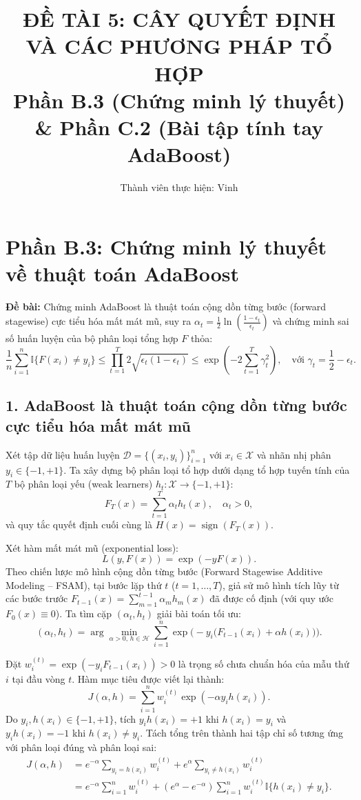 \documentclass[11pt, a4paper]{article}
\title{\textbf{\color{primary}ĐỀ TÀI 5: CÂY QUYẾT ĐỊNH VÀ CÁC PHƯƠNG PHÁP TỔ HỢP}\\
\large Phần B.3 (Chứng minh lý thuyết) \& Phần C.2 (Bài tập tính tay AdaBoost)}
\author{Thành viên thực hiện: Vinh}
\date{}
\begin{document}
\maketitle

\section*{Phần B.3: Chứng minh lý thuyết về thuật toán AdaBoost}

\textbf{Đề bài:} Chứng minh AdaBoost là thuật toán cộng dồn từng bước (forward stagewise) cực tiểu hóa mất mát mũ, suy ra $\alpha_t = \frac{1}{2}\ln\left(\frac{1-\epsilon_t}{\epsilon_t}\right)$ và chứng minh sai số huấn luyện của bộ phân loại tổng hợp $F$ thỏa:
\[
\frac{1}{n}\sum_{i=1}^{n} \mathbb{I}\{F(x_i) \ne y_i\} \le \prod_{t=1}^{T} 2\sqrt{\epsilon_t(1-\epsilon_t)} \le \exp\left(-2\sum_{t=1}^{T}\gamma_t^2\right), \quad \text{với } \gamma_t = \frac{1}{2} - \epsilon_t.
\]

\subsection*{1. AdaBoost là thuật toán cộng dồn từng bước cực tiểu hóa mất mát mũ}

Xét tập dữ liệu huấn luyện $\mathcal{D} = \{(x_i, y_i)\}_{i=1}^n$ với $x_i \in \mathcal{X}$ và nhãn nhị phân $y_i \in \{-1, +1\}$. Ta xây dựng bộ phân loại tổ hợp dưới dạng tổ hợp tuyến tính của $T$ bộ phân loại yếu (weak learners) $h_t: \mathcal{X} \to \{-1, +1\}$:
\[
F_T(x) = \sum_{t=1}^{T} \alpha_t h_t(x), \quad \alpha_t > 0,
\]
và quy tắc quyết định cuối cùng là $H(x) = \operatorname{sign}(F_T(x))$.

Xét hàm mất mát mũ (exponential loss):
\[
L(y, F(x)) = \exp(-y F(x)).
\]
Theo chiến lược mô hình cộng dồn từng bước (Forward Stagewise Additive Modeling -- FSAM), tại bước lặp thứ $t$ ($t = 1, \dots, T$), giả sử mô hình tích lũy từ các bước trước $F_{t-1}(x) = \sum_{m=1}^{t-1} \alpha_m h_m(x)$ đã được cố định (với quy ước $F_0(x) \equiv 0$). Ta tìm cặp $(\alpha_t, h_t)$ giải bài toán tối ưu:
\[
(\alpha_t, h_t) = \arg\min_{\alpha > 0, \, h \in \mathcal{H}} \sum_{i=1}^{n} \exp\Big(-y_i \big(F_{t-1}(x_i) + \alpha h(x_i)\big)\Big).
\]

Đặt $w_i^{(t)} = \exp(-y_i F_{t-1}(x_i)) > 0$ là trọng số chưa chuẩn hóa của mẫu thứ $i$ tại đầu vòng $t$. Hàm mục tiêu được viết lại thành:
\[
J(\alpha, h) = \sum_{i=1}^{n} w_i^{(t)} \exp(-\alpha y_i h(x_i)).
\]
Do $y_i, h(x_i) \in \{-1, +1\}$, tích $y_i h(x_i) = +1$ khi $h(x_i) = y_i$ và $y_i h(x_i) = -1$ khi $h(x_i) \ne y_i$. Tách tổng trên thành hai tập chỉ số tương ứng với phân loại đúng và phân loại sai:
\begin{align*}
J(\alpha, h) &= e^{-\alpha} \sum_{y_i = h(x_i)} w_i^{(t)} + e^{\alpha} \sum_{y_i \ne h(x_i)} w_i^{(t)} \\
&= e^{-\alpha} \sum_{i=1}^{n} w_i^{(t)} + \left(e^{\alpha} - e^{-\alpha}\right) \sum_{i=1}^{n} w_i^{(t)} \mathbb{I}\{h(x_i) \ne y_i\}.
\end{align*}
\end{document}
